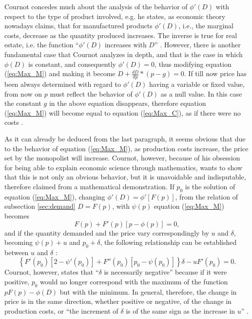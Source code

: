 \documentclass[12pt]{article}
\numberwithin{equation}{subsection}
\begin{document}
Cournot concedes much about the analysis of the behavior of $\phi '(D)$ with respect to the type of product involved, e.g. he states, as economic theory nowadays claims, that for manufactured products $\phi '(D)$, i.e., the marginal costs, decrease as the quantity produced increases. The inverse is true for real estate, i.e. the function ``$\phi '(D)$  increases with $D$'' \cite[p. 60]{cournot1897researches}. However, there is another fundamental case that Cournot analyzes in depth, and that is the case in which $\phi (D)$ is constant, and consequently $\phi '(D) = 0$, thus modifying equation (\ref{eq:Max_M}) and making it become $D+\frac{dD}{dp}*(p-g) = 0$. If till now price has been always determined with regard to $\phi '(D)$ having a variable or fixed value, from now on $p$ must reflect the behavior of $\phi '(D)$  as a null value. In this case the constant $g$ in the above equation disappears, therefore equation (\ref{eq:Max_M}) will become equal to equation (\ref{eq:Max_C}), as if there were no costs \citep[p. 59-61]{cournot1897researches}.

As it can already be deduced from the last paragraph, it seems obvious that due to the behavior of equation (\ref{eq:Max_M}), as production costs increase, the price set by the monopolist will increase. Cournot, however, because of his obsession for being able to explain economic science through mathematics, wants to show that this is not only an obvious behavior, but it is unavoidable and indisputable, therefore claimed from a mathematical demonstration. If $p_0$ is the solution of equation (\ref{eq:Max_M}), changing $\phi '(D)=\phi '[F(p)]$, from the relation of subsection \ref{sec:demand} $D = F(p)$, with $\psi(p)$ equation (\ref{eq:Max_M}) becomes \citep[p. 61]{cournot1897researches} \begin{equation}
F(p) + F'(p)\left[p - \phi(p)\right] = 0,
\end{equation} and if the quantity demanded and the price vary correspondingly by $u$ and $\delta$, becoming $\psi (p) + u$ and $p_0 + \delta$, the following relationship can be established between $u$ and $\delta$ \citep[p. 62]{cournot1897researches}: \begin{equation}
\left \{ F'(p_0)[2 - \psi '(p_0)] + F''(p_0)[p_0 - \psi (p_0)]\right \} \delta - uF'(p_0) = 0.
\end{equation} Cournot, however, states that ``$\delta$ is necessarily negative'' \cite[p. 62]{cournot1897researches} because if it were positive, $p_0$ would no longer correspond with the maximum of the function $pF(p)-\phi (D)$ but with the minimum. In general, therefore, the change in price is in the same direction, whether positive or negative, of the change in production costs, or ``the increment of $\delta$ is of the same sign as the increase in $u$'' \cite[p. 62]{cournot1897researches}.
\end{document}
